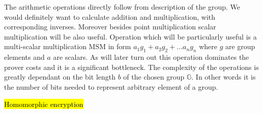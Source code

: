 The arithmetic operations directly follow from description of the group. We would definitely want to calculate addition and multiplication, with corresponding inverses. Moreover besides point multiplication scalar multiplication will be also useful. Operation which will be particularly useful is a multi-scalar multiplication MSM in form $a_1g_1 + a_2g_2 + ... a_ng_n$ where $g$ are group elements and $a$ are scalars. As will later turn out this operation dominates the prover costs and it is a significant bottleneck. The complexity of the operations is greatly dependant on the bit length $b$ of the chosen group $\mathbb{G}$. In other words it is the number of bits needed to represent arbitrary element of a group.

\hl{Homomorphic encryption}






